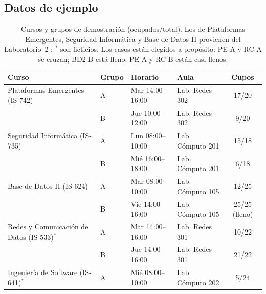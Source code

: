 \subsection{Datos de ejemplo}
\begin{table}[H]
	\centering\footnotesize
	\begin{tabular}{|l|l|l|l|c|}
		\hline
		\rowcolor{tablebackground}\color{white}\textbf{Curso} & \color{white}\textbf{Grupo} & \color{white}\textbf{Horario} & \color{white}\textbf{Aula} & \color{white}\textbf{Cupos}\\
		\hline
		Plataformas Emergentes (IS-742) & A & Mar 14:00--16:00 & Lab. Redes 302 & 17/20 \\
		& B & Jue 10:00--12:00 & Lab. Redes 302 & 9/20 \\\hline
		Seguridad Informática (IS-735) & A & Lun 08:00--10:00 & Lab. Cómputo 201 & 15/18 \\
		& B & Mié 16:00--18:00 & Lab. Cómputo 201 & 6/18 \\\hline
		Base de Datos II (IS-624) & A & Mar 08:00--10:00 & Lab. Cómputo 105 & 12/25 \\
		& B & Vie 14:00--16:00 & Lab. Cómputo 105 & 25/25 (lleno) \\\hline
		Redes y Comunicación de Datos (IS-533)$^\ast$ & A & Mar 14:00--16:00 & Lab. Redes 301 & 10/22 \\
		& B & Jue 14:00--16:00 & Lab. Redes 301 & 21/22 \\\hline
		Ingeniería de Software (IS-641)$^\ast$ & A & Mié 08:00--10:00 & Lab. Cómputo 202 & 5/24 \\\hline
	\end{tabular}
	\caption{Cursos y grupos de demostración (ocupados/total). Los de Plataformas Emergentes, Seguridad Informática y Base de Datos II provienen del Laboratorio~2 \cite{lab2}; $^\ast$ son ficticios. Los casos están elegidos a propósito: PE-A y RC-A se cruzan; BD2-B está lleno; PE-A y RC-B están casi llenos.}
	\label{tab:datos}
\end{table}
